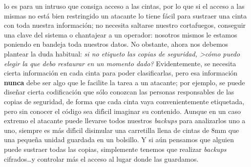 lo es para un intruso que consiga acceso a las cintas, por lo que si el acceso
a las mismas no est\'a bien restringido un atacante lo tiene f\'acil para 
sustraer una cinta con toda nuestra informaci\'on; no necesita saltarse nuestro
cortafuegos, conseguir una clave del sistema o chantajear a un operador: 
nosotros mismos le estamos poniendo en bandeja toda nuestros datos. No obstante,
ahora nos debemos plantear la duda habitual: {\it si no etiqueto las copias de 
seguridad,
>c\'omo puedo elegir la que debo restaurar en un momento dado?} Evidentemente,
se necesita cierta informaci\'on en cada cinta para poder clasificarlas, pero
esa informaci\'on {\bf nunca} debe ser algo que le facilite la tarea a un 
atacante; por ejemplo, se puede dise\~nar cierta codificaci\'on que s\'olo 
conozcan las personas responsables de las copias de seguridad, de forma que 
cada cinta vaya convenientemente etiquetada, pero sin conocer el c\'odigo sea
dif\'{\i}cil imaginar su contenido. Aunque en un caso extremo el atacante puede
llevarse todos nuestros {\it backups} para analizarlos uno a uno, siempre es
m\'as dif\'{\i}cil disimular una carretilla llena de cintas de 8mm que una
peque\~na unidad guardada en un bolsillo. Y si a\'un pensamos que alguien puede
sustraer todas las copias, simplemente tenemos que realizar {\it backups} 
cifrados\ldots y controlar m\'as el acceso al lugar donde las guardamos.
